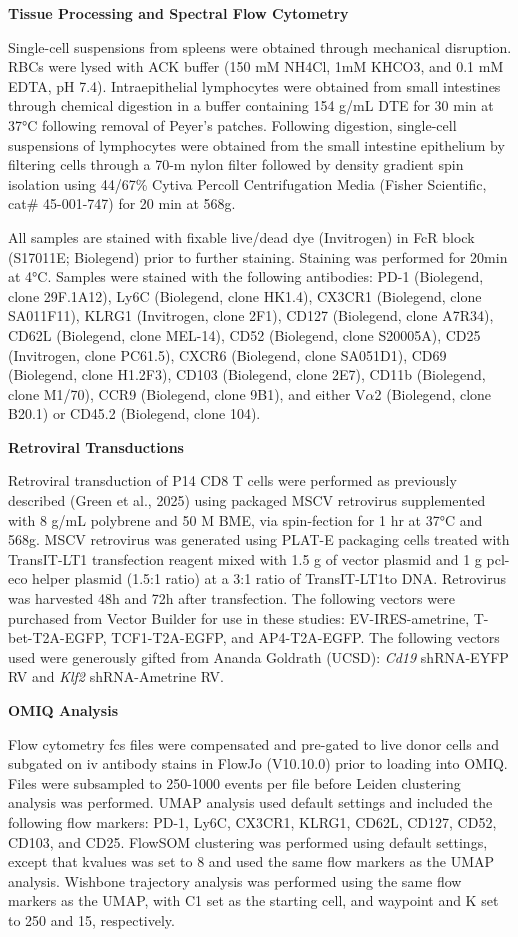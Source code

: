 \textbf{Tissue Processing and Spectral Flow Cytometry}

Single-cell suspensions from spleens were obtained through mechanical
disruption. RBCs were lysed with ACK buffer (150 mM NH4Cl, 1mM KHCO3,
and 0.1 mM EDTA, pH 7.4). Intraepithelial lymphocytes were obtained from
small intestines through chemical digestion in a buffer containing 154
\textmu{}g/mL DTE for 30 min at 37°C following removal of Peyer's patches.
Following digestion, single-cell suspensions of lymphocytes were
obtained from the small intestine epithelium by filtering cells through
a 70-\textmu{}m nylon filter followed by density gradient spin isolation using
44/67\% Cytiva Percoll Centrifugation Media (Fisher Scientific, cat\#
45-001-747) for 20 min at 568g.

All samples are stained with fixable live/dead dye (Invitrogen) in FcR
block (S17011E; Biolegend) prior to further staining. Staining was
performed for 20min at 4°C. Samples were stained with the following
antibodies: PD-1 (Biolegend, clone 29F.1A12), Ly6C (Biolegend, clone
HK1.4), CX3CR1 (Biolegend, clone SA011F11), KLRG1 (Invitrogen, clone
2F1), CD127 (Biolegend, clone A7R34), CD62L (Biolegend, clone MEL-14),
CD52 (Biolegend, clone S20005A), CD25 (Invitrogen, clone PC61.5), CXCR6
(Biolegend, clone SA051D1), CD69 (Biolegend, clone H1.2F3), CD103
(Biolegend, clone 2E7), CD11b (Biolegend, clone M1/70), CCR9 (Biolegend,
clone 9B1), and either V$\alpha$2 (Biolegend, clone B20.1) or CD45.2
(Biolegend, clone 104).

\textbf{Retroviral Transductions}

Retroviral transduction of P14 CD8 T cells were performed as previously
described (Green et al., 2025) using packaged MSCV retrovirus
supplemented with 8 \textmu{}g/mL polybrene and 50 \textmu{}M BME, via spin-fection for
1 hr at 37°C and 568g. MSCV retrovirus was generated using PLAT-E
packaging cells treated with TransIT-LT1 transfection reagent mixed with
1.5 \textmu{}g of vector plasmid and 1 \textmu{}g pcl-eco helper plasmid (1.5:1 ratio)
at a 3:1 ratio of TransIT-LT1to DNA. Retrovirus was harvested 48h and
72h after transfection. The following vectors were purchased from Vector
Builder for use in these studies: EV-IRES-ametrine, T-bet-T2A-EGFP,
TCF1-T2A-EGFP, and AP4-T2A-EGFP. The following vectors used were
generously gifted from Ananda Goldrath (UCSD): \emph{Cd19} shRNA-EYFP RV
and \emph{Klf2} shRNA-Ametrine RV.

\textbf{OMIQ Analysis}

Flow cytometry fcs files were compensated and pre-gated to live donor
cells and subgated on iv antibody stains in FlowJo (V10.10.0) prior to
loading into OMIQ. Files were subsampled to 250-1000 events per file
before Leiden clustering analysis was performed. UMAP analysis used
default settings and included the following flow markers: PD-1, Ly6C,
CX3CR1, KLRG1, CD62L, CD127, CD52, CD103, and CD25. FlowSOM clustering
was performed using default settings, except that kvalues was set to 8
and used the same flow markers as the UMAP analysis. Wishbone trajectory
analysis was performed using the same flow markers as the UMAP, with C1
set as the starting cell, and waypoint and K set to 250 and 15,
respectively.

